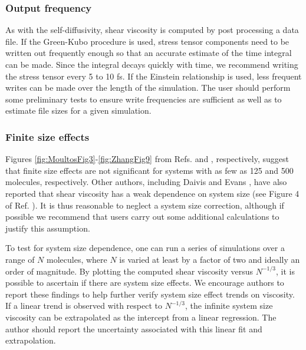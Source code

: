 \documentclass[9pt,bestpractices]{livecoms}
\begin{document}
\subsubsection{Output frequency} \label{sec:Viscosity:General: Output frequency}

As with the self-diffusivity, shear viscosity is computed by post processing a data file. If the Green-Kubo procedure is used, stress tensor components need to be written out frequently enough so that an accurate estimate of the time integral can be made. Since the integral decays quickly with time, we recommend writing the stress tensor every 5 to 10 fs. If the Einstein relationship is used, less frequent writes can be made over the length of the simulation. The user should perform some preliminary tests to ensure write frequencies are sufficient as well as to estimate file sizes for a given simulation.

\subsubsection{Finite size effects} \label{sec:Viscosity:General: Finite size}

Figures \ref{fig:MoultosFig3}-\ref{fig:ZhangFig9} from Refs. \cite{Moultos2016} and \cite{Zhang2015}, respectively, suggest that finite size effects are not significant for systems with as few as 125 and 500 molecules, respectively. Other authors, including Daivis and Evans \cite{Daivis:1995}, have also reported that shear viscosity has a weak dependence on system size (see Figure 4 of Ref. \cite{Daivis:1995}). It is thus reasonable to neglect a system size correction, although if possible we recommend that users carry out some additional calculations to justify this assumption. 

To test for system size dependence, one can run a series of simulations over a range of $N$ molecules, where $N$ is varied at least by a factor of two and ideally an order of magnitude. By plotting the computed shear viscosity versus $N^{-1/3}$, it is possible to ascertain if there are system size effects. We encourage authors to report these findings to help further verify system size effect trends on viscosity.  If a linear trend is observed with respect to $N^{-1/3}$, the infinite system size viscosity can be extrapolated as the intercept from a linear regression. The author should report the uncertainty associated with this linear fit and extrapolation.
\end{document}
